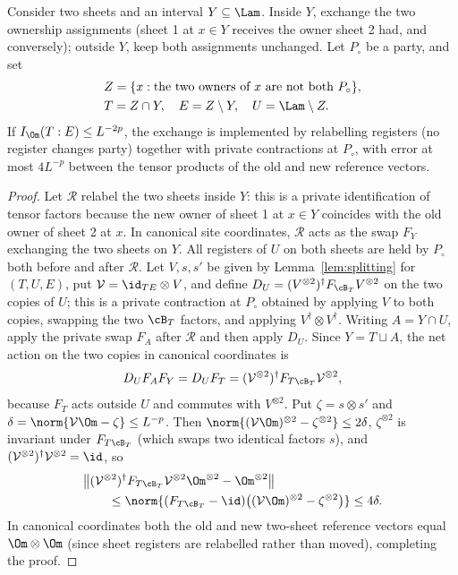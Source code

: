 \begin{lemma}\label{lem:exchange}
Consider two sheets and an interval $Y\subseteq\Lam$. Inside $Y$, exchange
the two ownership assignments (sheet 1 at $x\in Y$ receives the owner sheet 2
had, and conversely); outside $Y$, keep both assignments unchanged. Let $P_\circ$ be a party, and set
\[
\begin{split}
 &Z=\{x:\text{the two owners of }x\text{ are not both }P_\circ\},\\
 &T=Z\cap Y,\quad E=Z\setminus Y,\quad U=\Lam\setminus Z .
\end{split}
\]
If $I_\Om(T:E)\le L^{-2p}$, the exchange is implemented by relabelling
registers (no register changes party) together with private contractions at
$P_\circ$, with error at most $4L^{-p}$ between the tensor products of the old and
new reference vectors.
\end{lemma}
\begin{proof}
Let $\mathcal R$ relabel the two sheets inside $Y$: this is a private identification
of tensor factors because the new owner of sheet 1 at $x\in Y$ coincides with the old
owner of sheet 2 at $x$. In canonical site coordinates, $\mathcal R$ acts as the
swap $F_{Y}$ exchanging the two sheets on $Y$. All registers of $U$ on both sheets
are held by $P_\circ$ both before and after $\mathcal R$. Let $V,s,s'$ be given by
Lemma~\ref{lem:splitting} for $(T,U,E)$, put $\mathcal V=\id_{TE}\otimes V$, and
define $D_U=(V^{\otimes2})^\dagger F_{\cB_T}V^{\otimes2}$ on the two copies of
$U$; this is a private contraction at $P_\circ$ obtained by applying $V$ to both copies, swapping the
two $\cB_T$ factors, and applying $V^\dagger\otimes V^\dagger$. Writing $A=Y\cap U$, apply the private swap $F_A$ after
$\mathcal R$ and then apply $D_U$. Since
$Y=T\sqcup A$, the net action on the two copies in canonical coordinates is
\[
 D_UF_AF_Y=D_UF_T=(\mathcal V^{\otimes2})^\dagger F_{T\cB_T}\mathcal V^{\otimes2},
\]
because $F_T$ acts outside $U$ and commutes with $V^{\otimes2}$. Put
$\zeta=s\otimes s'$ and $\delta=\norm{\mathcal V\Om-\zeta}\le L^{-p}$. Then
$\norm{(\mathcal V\Om)^{\otimes2}-\zeta^{\otimes2}}\le2\delta$, $\zeta^{\otimes2}$
is invariant under $F_{T\cB_T}$ (which swaps two identical factors $s$), and
$(\mathcal V^{\otimes2})^\dagger\mathcal V^{\otimes2}=\id$, so
\[
\begin{split}
 &\bigl\|(\mathcal V^{\otimes2})^\dagger F_{T\cB_T}\mathcal V^{\otimes2}\Om^{\otimes2}-\Om^{\otimes2}\bigr\|\\
 &\qquad\le\norm{(F_{T\cB_T}-\id)\bigl((\mathcal V\Om)^{\otimes2}-\zeta^{\otimes2}\bigr)}\le4\delta .
\end{split}
\]
In canonical coordinates both the old and new two-sheet reference vectors equal
$\Om\otimes\Om$ (since sheet registers are relabelled rather than moved), completing the proof.
\end{proof}

